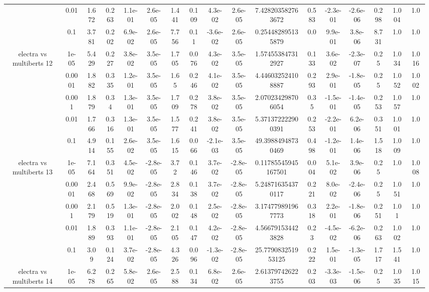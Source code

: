 \begin{tabular}{|c|c|c|c|c|c|c|c|c|c|c|c|c|c|c|c|c|}
 & 0.01 & 1.672 & 0.263 & 1.1e-01 & 2.6e-05 & 1.441 & 0.109 & 4.3e-02 & 2.6e-05 & 7.428203582763672 & 0.583 & -2.3e-01 & -2.6e-06 & 0.298 & 1.004 & 1.0 \\
 & 0.1 & 3.781 & 0.202 & 6.9e-02 & 2.6e-05 & 7.756 & 0.11 & -3.6e-02 & 2.6e-05 & 0.254482895135879 & 0.0 & 9.9e-01 & 3.8e-06 & 8.731 & 1.0 & 1.0 \\
\hline
\multirow{5}{*}{electra  vs multiberts 12} & 1e-05 & 5.429 & 0.227 & 3.8e-02 & 3.5e-05 & 1.705 & 0.076 & 4.3e-02 & 3.5e-05 & 1.574553847312927 & 0.133 & 3.6e-02 & -2.3e-07 & 0.25 & 1.034 & 1.016 \\
 & 0.0001 & 1.882 & 0.335 & 1.2e-01 & 3.5e-05 & 1.65 & 0.246 & 4.1e-02 & 3.5e-05 & 4.446032524108887 & 0.293 & 2.9e-01 & -1.8e-05 & 0.25 & 1.052 & 1.002 \\
 & 0.001 & 1.879 & 0.34 & 1.3e-01 & 3.5e-05 & 1.709 & 0.278 & 3.8e-02 & 3.5e-05 & 2.070234298706054 & 0.35 & -1.5e-01 & -1.4e-05 & 0.253 & 1.057 & 1.0 \\
 & 0.01 & 1.766 & 0.316 & 1.3e-01 & 3.5e-05 & 1.577 & 0.241 & 3.8e-02 & 3.5e-05 & 5.371372222900391 & 0.253 & -2.2e-01 & 6.2e-06 & 0.351 & 1.001 & 1.0 \\
 & 0.1 & 4.914 & 0.155 & 2.6e-02 & 3.5e-05 & 1.615 & 0.066 & -2.1e-03 & 3.5e-05 & 49.39884948730469 & 0.498 & -1.2e-01 & 1.4e-06 & 1.518 & 1.009 & 1.0 \\
\hline
\multirow{5}{*}{electra  vs multiberts 13} & 1e-05 & 7.164 & 0.351 & 4.5e-02 & -2.8e-05 & 3.72 & 0.146 & 3.7e-02 & -2.8e-05 & 0.11785545945167501 & 0.004 & 5.1e-02 & 3.9e-06 & 0.25 & 1.0 & 1.008 \\
 & 0.0001 & 2.468 & 0.569 & 9.9e-02 & -2.8e-05 & 2.834 & 0.138 & 3.7e-02 & -2.8e-05 & 5.248716354370117 & 0.221 & 8.0e-02 & -2.4e-06 & 0.25 & 1.051 & 1.0 \\
 & 0.001 & 2.179 & 0.519 & 1.3e-01 & -2.8e-05 & 2.002 & 0.148 & 2.5e-02 & -2.8e-05 & 3.174779891967773 & 0.318 & 2.2e-01 & -1.8e-06 & 0.251 & 1.01 & 1.0 \\
 & 0.01 & 1.889 & 0.393 & 1.1e-01 & -2.8e-05 & 2.105 & 0.147 & 4.2e-02 & -2.8e-05 & 4.566791534423828 & 0.23 & -4.5e-02 & -6.2e-06 & 0.263 & 1.002 & 1.0 \\
 & 0.1 & 3.09 & 0.124 & 3.7e-02 & -2.8e-05 & 4.326 & 0.096 & -1.3e-02 & -2.8e-05 & 25.779083251953125 & 0.222 & 1.5e-01 & -1.3e-05 & 1.717 & 1.541 & 1.0 \\
\hline
\multirow{5}{*}{electra  vs multiberts 14} & 1e-05 & 6.278 & 0.265 & 5.8e-02 & 2.6e-05 & 2.588 & 0.134 & 6.8e-02 & 2.6e-05 & 2.613797426223755 & 0.203 & -3.3e-03 & -1.5e-06 & 0.25 & 1.035 & 1.015 \\

\end{tabular}
